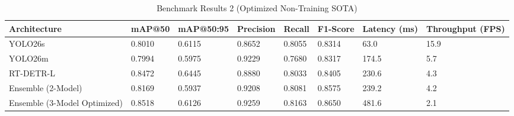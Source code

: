 \begin{table}
\caption{Benchmark Results 2 (Optimized Non-Training SOTA)}
\label{tab:main_benchmark_2}
\begin{tabular}{llllllll}
\toprule
Architecture & mAP@50 & mAP@50:95 & Precision & Recall & F1-Score & Latency (ms) & Throughput (FPS) \\
\midrule
YOLO26s & 0.8010 & 0.6115 & 0.8652 & 0.8055 & 0.8314 & 63.0 & 15.9 \\
YOLO26m & 0.7994 & 0.5975 & 0.9229 & 0.7680 & 0.8317 & 174.5 & 5.7 \\
RT-DETR-L & 0.8472 & 0.6445 & 0.8880 & 0.8033 & 0.8405 & 230.6 & 4.3 \\
Ensemble (2-Model) & 0.8169 & 0.5937 & 0.9208 & 0.8081 & 0.8575 & 239.2 & 4.2 \\
Ensemble (3-Model Optimized) & 0.8518 & 0.6126 & 0.9259 & 0.8163 & 0.8650 & 481.6 & 2.1 \\
\bottomrule
\end{tabular}
\end{table}
